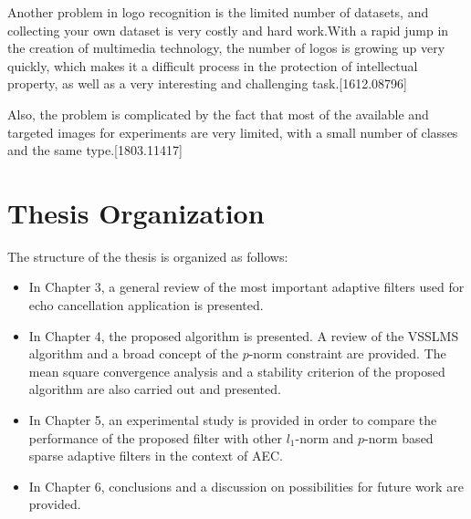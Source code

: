 \vspace{-0.5cm}
\par Another problem in logo recognition is the limited number of datasets, and collecting your own dataset is very costly and hard work.With a rapid jump in the creation of multimedia technology, the number of logos is growing up very quickly, which makes it a difficult process in the protection of intellectual property, as well as a very interesting and challenging task.[1612.08796] 

\vspace{-0.5cm}
\par Also, the problem is complicated by the fact that most of the available and targeted images for experiments are very limited, with a small number of classes and the same type.[1803.11417]  


\vspace{-0.3cm}
\section{Thesis Organization}\label{sec:2.3}
\vspace{-0.5cm}
\noindent The structure of the thesis is organized as follows:

\vspace{-0.8cm}
\begin{itemize}
  \item  In Chapter 3, a general review of the most important adaptive filters used for echo cancellation application is presented. %
\vspace{-0.3cm}
  \item In Chapter 4, the proposed algorithm is presented. A review of the VSSLMS algorithm and a broad concept of the $p$-norm constraint are provided. The mean square convergence analysis and a stability criterion of the proposed algorithm are also carried out and presented.
\vspace{-0.3cm}
  \item In Chapter 5, an experimental study is provided in order to compare the performance of the proposed filter with other $l_1$-norm and $p$-norm based sparse adaptive filters  in the context of AEC.
\vspace{-0.3cm}
  \item In Chapter 6, conclusions and a discussion on possibilities for future work are provided.
\end{itemize}

\vspace{-0.5cm}
